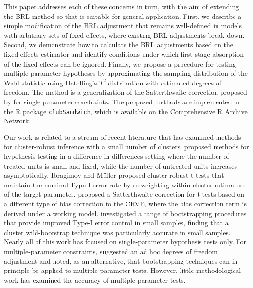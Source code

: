 \documentclass[12pt]{article}\usepackage[]{graphicx}\usepackage[]{color}
\begin{document}
This paper addresses each of these concerns in turn, with the aim of extending the BRL method so that is suitable for general application. 
First, we describe a simple modification of the BRL adjustment that remains well-defined in models with arbitrary sets of fixed effects, where existing BRL adjustments break down. 
Second, we demonstrate how to calculate the BRL adjustments based on the fixed effects estimator and identify conditions under which first-stage absorption of the fixed effects can be ignored.
Finally, we propose a procedure for testing multiple-parameter hypotheses by approximating the sampling distribution of the Wald statistic using Hotelling's $T^2$ distribution with estimated degrees of freedom. 
The method is a generalization of the Satterthwaite correction proposed by \citet{Bell2002bias} for single parameter constraints. 
The proposed methods are implemented in the R package \texttt{clubSandwich}, which is available on the Comprehensive R Archive Network.

Our work is related to a stream of recent literature that has examined methods for cluster-robust inference with a small number of clusters. 
\citet{Conley2011inference} proposed methods for hypothesis testing in a difference-in-differences setting where the number of treated units is small and fixed, while the number of untreated units increases asymptotically. 
Ibragimov and M\"{u}ller \citeyearpar{Ibragimov2010tstatistic, Ibragimov2016inference} proposed cluster-robust t-tests that maintain the nominal Type-I error rate by re-weighting within-cluster estimators of the target parameter.
\citet{Young2016improved} proposed a Satterthwaite correction for t-tests based on a different type of bias correction to the CRVE, where the bias correction term is derived under a working model.
\citet{Cameron2008bootstrap} investigated a range of bootstrapping procedures that provide improved Type-I error control in small samples, finding that a cluster wild-bootstrap technique was particularly accurate in small samples. 
Nearly all of this work has focused on single-parameter hypothesis tests only. 
For multiple-parameter constraints, \citet{Cameron2015practitioners} suggested an ad hoc degrees of freedom adjustment and noted, as an alternative, that bootstrapping techniques can in principle be applied to multiple-parameter tests. 
However, little methodological work has examined the accuracy of multiple-parameter tests.
\end{document}
